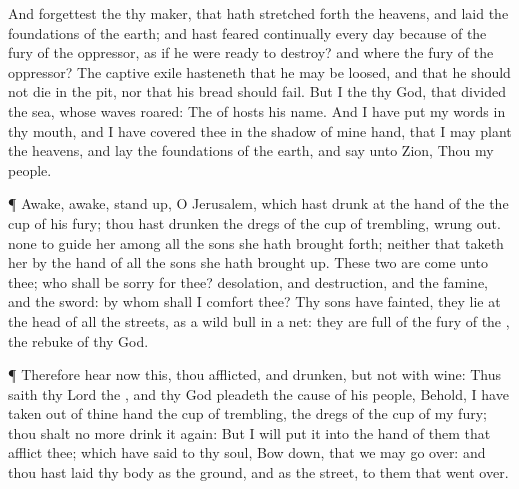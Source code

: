 {And
forgettest the
{} thy
maker, that hath stretched
forth the
heavens, and laid the
foundations of the
earth; and hast
feared
continually every
day
because of the
fury of the
oppressor, as
if he were
ready to
destroy? and where
{} the
fury of the
oppressor?
The captive
exile
hasteneth that he may be
loosed, and that he should not
die in the
pit, nor that his
bread should
fail.
But I
{} the
{} thy
God, that
divided the
sea, whose
waves
roared: The
{} of
hosts
{} his
name.
And I have
put my
words in thy
mouth, and I have
covered thee in the
shadow of mine
hand, that I may
plant the
heavens, and lay the
foundations of the
earth, and
say unto
Zion, Thou
{} my
people.
\par }{\PP {}¶
Awake,
awake, stand
up, O
Jerusalem, which hast
drunk at the
hand of the
{} the
cup of his
fury; thou hast
drunken the
dregs of the
cup of
trembling,
{} wrung
{}
out.
 none to
guide her among all the
sons
{} she hath brought
forth; neither
{} that
taketh her by the
hand of all the
sons
{} she hath brought
up.
These
two
{} are
come unto thee; who shall be
sorry for thee?
desolation, and
destruction, and the
famine, and the
sword: by whom shall I
comfort thee?
Thy
sons have
fainted, they
lie at the
head of all the
streets, as a wild
bull in a
net: they are
full of the
fury of the
{}, the
rebuke of thy
God.
\par }{\PP {}¶ Therefore
hear now this, thou
afflicted, and
drunken, but not with
wine:
Thus
saith thy
Lord the
{}, and thy
God
{}
pleadeth the cause of his
people, Behold, I have taken
out of thine
hand the
cup of
trembling,
{} the
dregs of the
cup of my
fury; thou shalt no
more drink it
again:
But I will
put it into the
hand of them that
afflict thee; which have
said to thy
soul, Bow
down, that we may go
over: and thou hast
laid thy
body as the
ground, and as the
street, to them that went
over.

}
